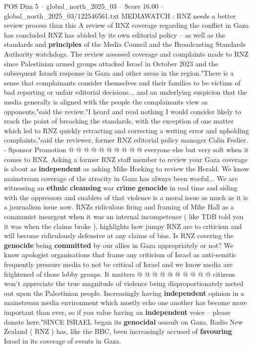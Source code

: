 \begin{textsample}{POS Dim 5 – global\_north\_2025\_03 – Score 16.00 – global\_north\_2025\_03/122546561.txt}  \label{ex:f5_pos_157}
MEDIAWATCH : RNZ needs a better review process than this A review of RNZ coverage regarding the conflict in Gaza has concluded RNZ has abided by its own editorial policy -- as well as the standards and \textbf{principles} of the Media Council and the Broadcasting Standards Authority watchdogs.
The review assessed coverage and complaints made to RNZ since Palestinian armed groups attacked Israel in October 2023 and the subsequent Israeli response in Gaza and other areas in the region."There is a sense that complainants consider themselves and their families to be victims of bad reporting or unfair editorial decisions... and an underlying suspicion that the media generally is aligned with the people the complainants view as opponents,"said the review."I heard and read nothing I would consider likely to reach the point of breaching the standards, with the exception of one matter which led to RNZ quickly retracting and correcting a writing error and upholding complaints,"said the reviewer, former RNZ editorial policy manager Colin Feslier. - Sponsor Promotion @ @ @ @ @ @ @ @ @ @ everyone else but very soft when it comes to RNZ.
Asking a former RNZ staff member to review your Gaza coverage is about as \textbf{independent} as asking Mike Hosking to review the Herald.
We know mainstream coverage of the atrocity in Gaza has always been woeful...
We are witnessing an \textbf{ethnic} \textbf{cleansing} war \textbf{crime} \textbf{genocide} in real time and siding with the oppressors and enablers of that violence is a moral issue as much as it is a journalism issue now.
RNZs ridiculous firing and framing of Mike Hall as a communist insurgent when it was an internal incompetence ( like TDB told you it was when the claims broke ), highlights how jumpy RNZ are to criticism and will become ridiculously defensive at any claims of bias.
Is RNZ covering the \textbf{genocide} being \textbf{committed} by our allies in Gaza appropriately or not?
We know apologist organisations that frame any criticism of Israel as anti-semitic frequently pressure media to not be critical of Israel and we know media are frightened of those lobby groups.
It matters @ @ @ @ @ @ @ @ @ @ citizens won't appreciate the true magnitude of violence being disproportionately meted out upon the Palestinian people.
Increasingly having \textbf{independent} opinion in a mainstream media environment which mostly echo one another has become more important than ever, so if you value having an \textbf{independent} voice -- please donate here."SINCE ISRAEL began its \textbf{genocidal} assault on Gaza, Radio New Zealand ( RNZ ) has, like the BBC, been increasingly accused of \textbf{favouring} Israel in its coverage of events in Gaza.

\end{textsample}
